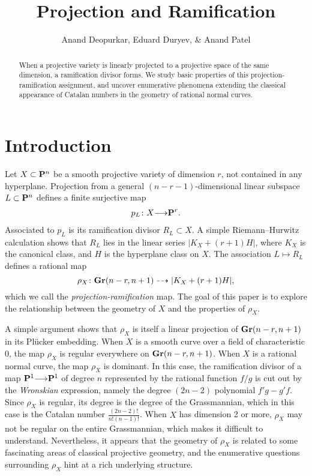 \documentclass[11pt,reqno]{amsart}
\title{Projection and Ramification}
\author{Anand Deopurkar, Eduard Duryev, \& Anand Patel}
\theoremstyle{plain}
\theoremstyle{definition}
\theoremstyle{remark}
\numberwithin{equation}{section}
\renewcommand{\to}{{\longrightarrow}}
\numberwithin{equation}{section}
\begin{document}
\begin{abstract}
    When a projective variety is linearly projected to a projective space of the same dimension, a ramification divisor forms. We study basic properties of this projection-ramification assignment, and uncover enumerative phenomena extending the classical appearance of Catalan numbers in the geometry of rational normal curves.
\end{abstract}


\maketitle
\tableofcontents


\section{Introduction}
Let $X \subset \P^n$ be a smooth projective variety of dimension $r$, not contained in any hyperplane.
Projection from a general $(n-r-1)$-dimensional linear subspace $L \subset \P^n$ defines a finite surjective map
\begin{align*}
  p_{L}\from X \to \P^{r}.
\end{align*}
Associated to $p_L$ is its ramification divisor $R_L \subset X$.
A simple Riemann--Hurwitz calculation shows that $R_L$ lies in the linear series $|K_X + (r+1)H|$, where $K_X$ is the canonical class, and $H$ is the hyperplane class on $X$.
The association $L \mapsto R_L$ defines a rational map
\[ \rho_X \from \Gr(n-r, n+1) \dashrightarrow |K_X + (r+1)H|, \]
which we call the \emph{projection-ramification} map.
The goal of this paper is to explore the relationship between the geometry of $X$ and the properties of $\rho_X$.

A simple argument shows that $\rho_X$ is itself a linear projection of $\Gr(n-r, n+1)$ in its Pl\"ucker embedding.
When $X$ is a smooth curve over a field of characteristic $0$, the map $\rho_X$ is regular everywhere on $\Gr(n-r, n+1)$.
When $X$ is a rational normal curve, the map $\rho_X$ is dominant.
In this case, the ramification divisor of a map $\P^1 \to \P^1$ of degree $n$ represented by the rational function $f/g$ is cut out by the \emph{Wronskian} expression, namely the degree $(2n-2)$ polynomial $f'g - g'f$.
Since $\rho_X$ is regular, its degree is the degree of the Grassmannian, which in this case is the Catalan number $\frac{(2n-2)!}{n!(n-1)!}$.
When $X$ has dimension 2 or more, $\rho_X$ may not be regular on the entire Grassmannian, which makes it difficult to understand.
Nevertheless, it appears that the geometry of $\rho_X$ is related to some fascinating areas of classical projective geometry, and the enumerative questions surrounding $\rho_X$ hint at a rich underlying structure. 
\end{document}
